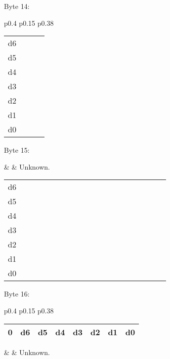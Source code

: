 Byte 14:

\begin{tabular}{p{0.4\linewidth} p{0.15\linewidth} p{0.38\linewidth}} 

\begin{tabular}{|p{0.3cm}|p{0.3cm}|p{0.3cm}|p{0.3cm}|p{0.3cm}|p{0.3cm}|p{0.3cm}|p{0.3cm}|}
\hline
0 & d6 & d5 & d4 & d3 & d2 & d1 & d0\\
\hline
\end{tabular}
&  & Unknown.\\
\end{tabular}

\begin{tabular}{p{0.05\linewidth} p{0.6\linewidth}} 
d6 & \\
d5 & \\
d4 & \\
d3 & \\
d2 & \\
d1 & \\
d0 & \\
\end{tabular}

Byte 15:

&  & Unknown.\\
\end{tabular}

\begin{tabular}{p{0.05\linewidth} p{0.6\linewidth}} 
d6 & \\
d5 & \\
d4 & \\
d3 & \\
d2 & \\
d1 & \\
d0 & \\
\end{tabular}

Byte 16:

\begin{tabular}{p{0.4\linewidth} p{0.15\linewidth} p{0.38\linewidth}} 

\begin{tabular}{|p{0.3cm}|p{0.3cm}|p{0.3cm}|p{0.3cm}|p{0.3cm}|p{0.3cm}|p{0.3cm}|p{0.3cm}|}
\hline
0 & d6 & d5 & d4 & d3 & d2 & d1 & d0\\
\hline
\end{tabular}
&  & Unknown.\\
\end{tabular}

